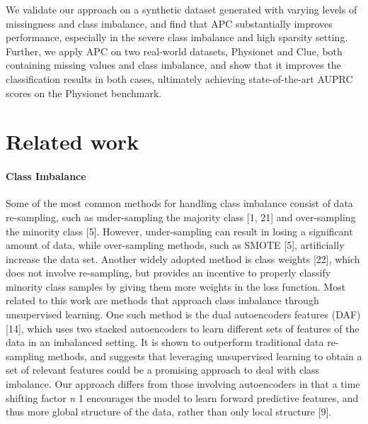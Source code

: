 \documentclass{article}
\begin{document}
We validate our approach on a synthetic dataset generated with varying levels of missingness and class imbalance, and find that APC substantially improves performance, especially in the severe class imbalance and high sparsity setting.
Further, we apply APC on two real-world datasets, Physionet and Clue, both containing missing values and class imbalance, and show that it improves the classification results in both cases, ultimately achieving  state-of-the-art AUPRC scores on the Physionet benchmark.


\section{Related work}
\paragraph{Class Imbalance}

Some of the most common methods for handling class imbalance consist of data re-sampling, such as under-sampling the majority class [1, 21]
and over-sampling the minority class [5].
However, under-sampling can result in losing a significant amount of data, 
while over-sampling methods, such as SMOTE [5],
artificially increase the data set.
Another widely adopted method is class weights [22],
which does not involve re-sampling, but provides an incentive to properly classify minority class samples by giving them more weights in the loss function. Most related to this work are methods that approach class imbalance through unsupervised learning. One such method is the dual autoencoders features (DAF) [14], which 
uses two stacked autoencoders to learn different sets of features of the data in an imbalanced setting. 
It is shown to outperform traditional data re-sampling methods, and suggests that leveraging unsupervised learning to obtain a set of relevant features could be a promising approach to deal with class imbalance. 
Our approach differs from those involving autoencoders in that a time shifting factor \textit{n}  1 encourages the  model to learn forward predictive features, and thus more global structure of the data, rather than only local structure [9]. 
\end{document}
